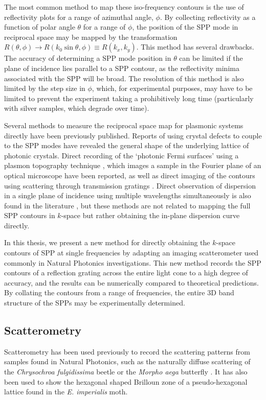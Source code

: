 The most common method to map these iso-frequency contours is the use of reflectivity plots for a range of azimuthal angle, $\phi$. By collecting reflectivity as a function of polar angle $\theta$ for a range of $\phi$, the position of the SPP mode in reciprocal space may be mapped by the transformation $R(\theta,\phi) \rightarrow R(k_0\sin\theta,\phi)\equiv R(k_x,k_y)$. This method has several drawbacks. The accuracy of determining a SPP mode position in $\theta$ can be limited if the plane of incidence lies parallel to a SPP contour, as the reflectivity minima associated with the SPP will be broad. The resolution of this method is also limited by the step size in $\phi$, which, for experimental purposes, may have to be limited to prevent the experiment taking a prohibitively long time (particularly with silver samples, which degrade over time).

Several methods to measure the reciprocal space map for plasmonic systems directly have been previously published. Reports of using crystal defects \cite{Shi2010} to couple to the SPP modes have revealed the general shape of the underlying lattice of photonic crystals. Direct recording of the `photonic Fermi surfaces' using a plasmon topography technique \cite{Regan2011}, which images a sample in the Fourier plane of an optical microscope have been reported, as well as  direct imaging of the contours using scattering through transmission gratings \cite{Giannattasio2005}. Direct observation of dispersion in a single plane of incidence using multiple wavelengths simultaneously is also found in the literature \cite{Tetz2005,Kitson1996a,Swalen1980}, but these methods are not related to mapping the full SPP contours in $k$-space but rather obtaining the in-plane dispersion curve directly.

In this thesis, we present a new method for directly obtaining the $k$-space contours of SPP at single frequencies by adapting an imaging scatterometer used commonly in Natural Photonics investigations. This new method records the SPP contours of a reflection grating across the entire light cone to a high degree of accuracy, and the results can be numerically compared to theoretical predictions. By collating the contours from a range of frequencies, the entire 3D band structure of the SPPs may be experimentally determined.

\subsection{Scatterometry}
Scatterometry has been used previously to record the scattering patterns from samples found in Natural Photonics, such as the naturally diffuse scattering of the \textit{Chrysochroa fulgidissima} beetle \cite{Stavenga2011} or the \textit{Morpho aega} butterfly \cite{Stavenga2009a}. It has also been used to show the hexagonal shaped Brilloun zone of a pseudo-hexagonal lattice found in the \textit{E. imperialis} moth\cite{BD2012}. 

